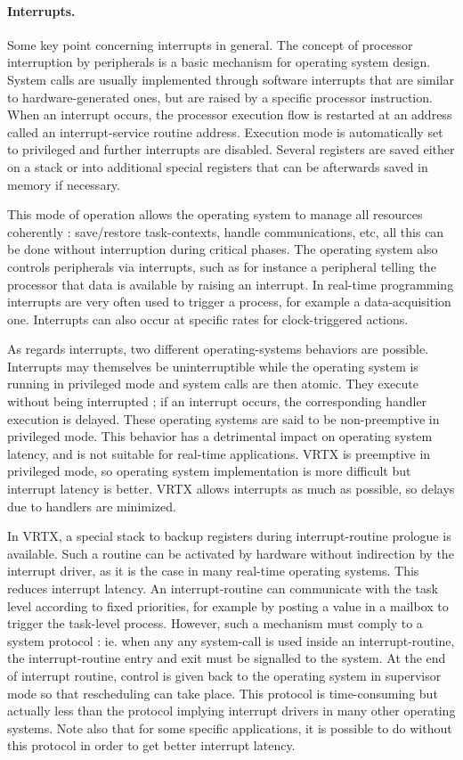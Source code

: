 \documentclass[10pt]{report}
\begin{document}
\paragraph{Interrupts.} Some key point concerning interrupts in general. The concept of 
processor interruption by peripherals is a basic mechanism for 
operating system design. System calls are usually implemented 
through software interrupts that are similar to 
hardware-generated ones, but are raised by a specific processor 
instruction. When an interrupt occurs, the processor execution 
flow is restarted at an address called an interrupt-service 
routine address. Execution mode is automatically set to 
privileged and further interrupts are disabled. Several registers 
are saved either on a stack or into additional special registers 
that can be afterwards saved in memory if necessary.

This mode of operation allows the operating system to manage all 
resources coherently : save/restore task-contexts, handle 
communications, etc, all this can be done without interruption 
during critical phases. The operating system also controls 
peripherals via interrupts, such as for instance a peripheral 
telling the processor that data is available by raising an 
interrupt. In real-time programming interrupts are very often 
used to trigger a process, for example a data-acquisition one. 
Interrupts can also occur at specific rates for clock-triggered 
actions.

As regards interrupts, two different operating-systems behaviors 
are possible. Interrupts may themselves be uninterruptible while 
the operating system is running in privileged mode and system 
calls are then atomic. They execute without being interrupted ; 
if an interrupt occurs, the corresponding handler execution is 
delayed. These operating systems are said to be non-preemptive in 
privileged mode. This behavior has a detrimental impact on 
operating system latency, and is not suitable for real-time 
applications. VRTX is preemptive in privileged mode, so operating 
system implementation is more difficult but interrupt latency is 
better. VRTX allows interrupts as much as possible, so delays due 
to handlers are minimized.

In VRTX, a special stack to backup registers during 
interrupt-routine prologue is available. Such a routine can be 
activated by hardware without indirection by the interrupt 
driver, as it is the case in many real-time operating systems. 
This reduces interrupt latency. An interrupt-routine can 
communicate with the task level according to fixed priorities, 
for example by posting a value in a mailbox to trigger the 
task-level process. However, such a mechanism must comply to a 
system protocol : ie. when any any system-call is used inside an 
interrupt-routine, the interrupt-routine entry and exit must be 
signalled to the system. At the end of interrupt routine, control 
is given back to the operating system in supervisor mode so that 
rescheduling can take place. This protocol is time-consuming but 
actually less than the protocol implying interrupt drivers in 
many other operating systems. Note also that for some specific 
applications, it is possible to do without this protocol in order 
to get better interrupt latency.
\end{document}
